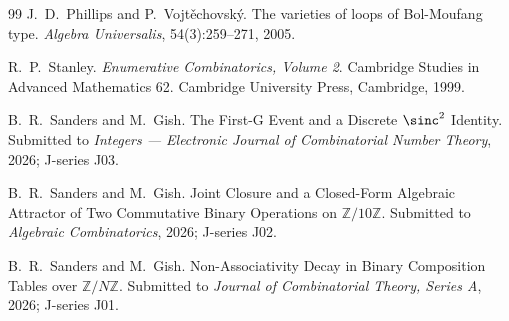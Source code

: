 \documentclass[11pt,reqno]{amsart}
\theoremstyle{plain}
\theoremstyle{definition}
\theoremstyle{remark}
\newcommand{\Z}{\mathbb{Z}}
\begin{document}
\begin{thebibliography}{99}
J.~D.~Phillips and P.~Vojt\v{e}chovsk\'y.
\newblock The varieties of loops of Bol-Moufang type.
\newblock \emph{Algebra Universalis}, 54(3):259--271, 2005.

R.~P.~Stanley.
\newblock \emph{Enumerative Combinatorics, Volume 2}.
\newblock Cambridge Studies in Advanced Mathematics 62.
\newblock Cambridge University Press, Cambridge, 1999.

B.~R.~Sanders and M.~Gish.
\newblock The First-G Event and a Discrete $\sinc^{2}$ Identity.
\newblock Submitted to \emph{Integers --- Electronic Journal of
Combinatorial Number Theory}, 2026; J-series J03.

B.~R.~Sanders and M.~Gish.
\newblock Joint Closure and a Closed-Form Algebraic Attractor of Two
Commutative Binary Operations on $\Z/10\Z$.
\newblock Submitted to \emph{Algebraic Combinatorics}, 2026;
J-series J02.

B.~R.~Sanders and M.~Gish.
\newblock Non-Associativity Decay in Binary Composition Tables over
$\Z/N\Z$.
\newblock Submitted to \emph{Journal of Combinatorial Theory,
Series A}, 2026; J-series J01.

\end{thebibliography}
\end{document}
